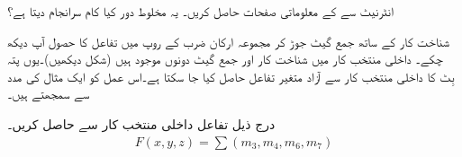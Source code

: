 انٹرنیٹ سے    کے معلوماتی صفحات حاصل کریں۔ یہ مخلوط دور کیا کام سرانجام دیتا ہے؟


 شناخت کار کے ساتھ  جمع گیٹ جوڑ کر مجموعہ ارکان ضرب کے روپ  میں تفاعل کا حصول آپ دیکھ چکے۔ داخلی منتخب کار میں    شناخت کار اور  جمع گیٹ دونوں موجود  ہیں (شکل   دیکھیں)۔یوں     پتہ بِٹ کا    داخلی منتخب کار  سے   آزاد متغیر  تفاعل  حاصل کیا جا سکتا ہے۔اس عمل کو ایک  مثال  کی مدد سے سمجھتے ہیں۔
 
 درج ذیل تفاعل    داخلی منتخب کار   سے حاصل کریں۔
 \begin{align*}
 F(x,y,z)=\sum (m_3,m_4,m_6,m_7)
 \end{align*}

